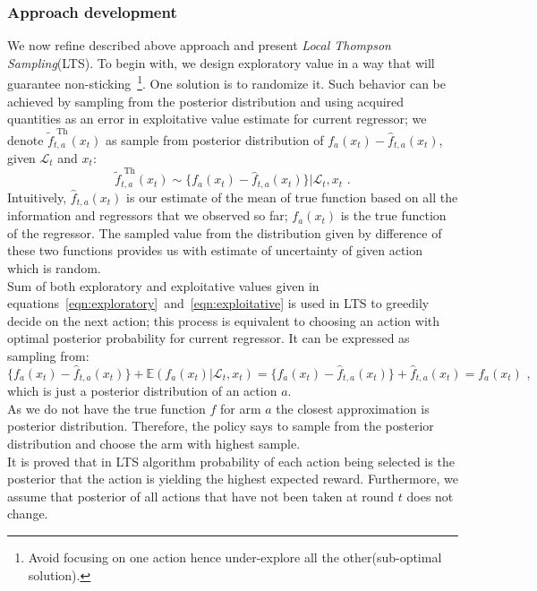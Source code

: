 \documentclass[12pt, a4paper, pdflatex, leqno]{report}
\begin{document}
\subsubsection{Approach development}
We now refine described above approach and present \emph{Local Thompson Sampling}(LTS). To begin with, we design exploratory value in a way that will guarantee non-sticking~\footnote{Avoid focusing on one action hence under-explore all the other(sub-optimal solution).}. One solution is to randomize it. Such behavior can be achieved by sampling from the posterior distribution and using acquired quantities as an error in exploitative value estimate for current regressor; we denote $\tilde{f}_{t,a}^{\text{ Th}} (x_t)$ as sample from posterior distribution of $f_a(x_t) - \hat{f}_{t,a}(x_t)$, given $\mathscr{L}_t$ and $x_t$:
\begin{equation}
  \label{eqn:exploratory} \tilde{f}_{t,a}^{\text{ Th}} (x_t) \sim \{ f_a(x_t) - \hat{f}_{t,a}(x_t) \} | \mathscr{L}_t,x_t \text{ .}
\end{equation}
Intuitively, $\hat{f}_{t,a}(x_t)$ is our estimate of the mean of true function based on all the information and regressors that we observed so far; $f_a(x_t)$ is the true function of the regressor. The sampled value from the distribution given by difference of these two functions provides us with estimate of uncertainty of given action which is random.\\

Sum of both exploratory and exploitative values given in equations~\ref{eqn:exploratory}~and~\ref{eqn:exploitative} is used in LTS to greedily decide on the next action; this process is equivalent to choosing an action with optimal posterior probability for current regressor. It can be expressed as sampling from:
$$
\{ f_a(x_t) - \hat{f}_{t,a}(x_t) \} +  \mathbb{E} ( f_a(x_t) | \mathscr{L}_t, x_t )
=
 \{ f_a(x_t) - \hat{f}_{t,a}(x_t) \}+ \hat{f}_{t,a} (x_t)
 =
 f_a(x_t) \text{ ,}
$$
which is just a posterior distribution of an action $a$.\\
As we do not have the true function $f$ for arm $a$ the closest approximation is posterior distribution. Therefore, the policy says to sample from the posterior distribution and choose the arm with highest sample.\\
It is proved that in LTS algorithm probability of each action being selected is the posterior that the action is yielding the highest expected reward. Furthermore, we assume that posterior of all actions that have not been taken at round $t$ does not change.\\
\end{document}
